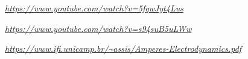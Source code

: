 \textit{\url{https://www.youtube.com/watch?v=5fqwJyt4Lus}}

\textit{\url{https://www.youtube.com/watch?v=s94suB5uLWw}}

\textit{\url{https://www.ifi.unicamp.br/~assis/Amperes-Electrodynamics.pdf}}

